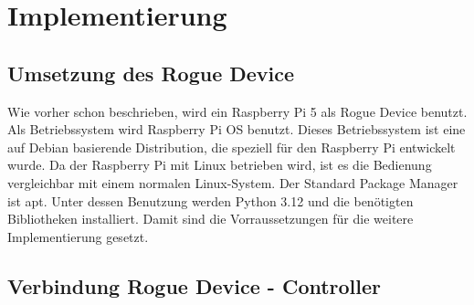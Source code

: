 \chapter{Implementierung}

\section{Umsetzung des Rogue Device}
Wie vorher schon beschrieben, wird ein Raspberry Pi 5 als Rogue Device benutzt. 
Als Betriebssystem wird Raspberry Pi OS benutzt. Dieses Betriebssystem ist eine auf Debian basierende Distribution, 
die speziell für den Raspberry Pi entwickelt wurde. Da der Raspberry Pi mit Linux betrieben wird, ist es die Bedienung
vergleichbar mit einem normalen Linux-System. Der Standard Package Manager ist apt. Unter dessen Benutzung werden 
Python 3.12 und die benötigten Bibliotheken installiert. Damit sind die Vorraussetzungen für die weitere Implementierung
gesetzt.


\section{Verbindung Rogue Device - Controller}

